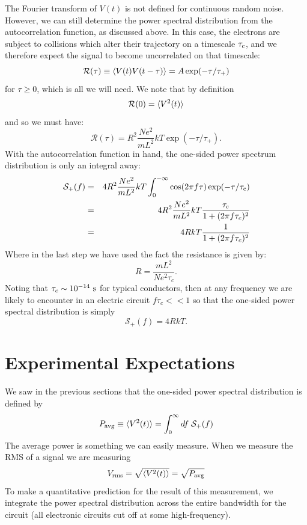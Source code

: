 \documentclass[12pt]{article}
\begin{document}
The Fourier transform of $V(t)$ is not defined for continuous random noise.  However, we can still determine the power spectral distribution from the autocorrelation function, as discussed above.  In this case, the electrons are subject to collisions which alter their trajectory on a timescale $\tau_{\rm c}$, and we therefore expect the signal to become uncorrelated on that timescale:
\begin{displaymath}
\mathcal{R}(\tau) \equiv \braket{V(t) V(t-\tau)} =  A \exp(-\tau/\tau_+)
\end{displaymath} 
for $\tau \geq 0$, which is all we will need.  We note that by definition
\begin{displaymath}
\mathcal{R}(0) = \braket{V^2(t)} 
\end{displaymath}
and so we must have:
\begin{displaymath}
\mathcal{R}(\tau) = R^2 \frac{N e^2}{m L^2} kT \exp(-\tau/\tau_+).
\end{displaymath} 
With the autocorrelation function in hand, the one-sided power spectrum distribution is only an integral away:
\begin{eqnarray*}
\mathcal{S}_{+}(f) &=& 4R^2 \frac{N e^2}{m L^2} kT \int_0^{-\infty}\cos(2\pi f \tau) \exp(-\tau/\tau_{\rm c})\\
 &=& 4R^2 \frac{N e^2}{m L^2} kT \frac{\tau_{\rm c}}{1+(2 \pi f \tau_c)^2} \\
 &=& 4R kT \frac{1}{1+(2 \pi f \tau_c)^2} \\
\end{eqnarray*} 
Where in the last step we have used the fact the resistance is given by:
\begin{displaymath}
R = \frac{m L^2}{N e^2 \tau_c}.
\end{displaymath}
Noting that $\tau_c \sim 10^{-14}~\rm s$ for typical conductors, then at any frequency we are likely to encounter in an electric circuit $f \tau_c << 1$ so that the one-sided power spectral distribution is simply
\begin{equation}
\mathcal{S}_{+}(f) = 4 R k T.
\end{equation}

\section{Experimental Expectations}

We saw in the previous sections that the one-sided power spectral distribution is defined by
\begin{equation}
P_{\rm avg} \equiv \braket{V^2(t)} = \int_{0}^{\infty} df \; \mathcal{S}_+(f) 
\end{equation}
The average power is something we can easily measure.  When we measure the RMS of a signal we are measuring 
\begin{displaymath}
V_{\rm rms} = \sqrt{\braket{V^2(t)}} = \sqrt{P_{\rm avg}}
\end{displaymath}
To make a quantitative prediction for the result of this measurement, we integrate the power spectral distribution across the entire bandwidth for the circuit (all electronic circuits cut off at some high-frequency).
\end{document}

